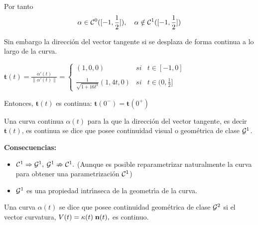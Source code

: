 \documentclass[twoside]{report}
\begin{document}
\vspace{0.3cm}

Por tanto $$\alpha\in {\cal C}^0([-1,\frac{1}{2}]), \quad \alpha\notin {\cal C}^1([-1,\frac{1}{2}])$$

Sin embargo la direcci\'{o}n del vector tangente si se desplaza de forma continua a lo largo de la curva.

$\mathbf{t}(t)=\frac{\alpha'(t)}{\parallel\alpha'(t)\parallel}=\left\{\begin{array}{ccc}
(1,0,0) & si & t\in [-1,0]\\
 & & \\
\displaystyle \frac{1}{\sqrt{1+16t^2}}(1,4t,0) & si & t\in (0,
\frac{1}{2}]
\end{array}\right.$

\vspace{0.3cm}


Entonces, $\mathbf{t}(t)$ es continua: $\mathbf{t}(0^{-})= \mathbf{t}(0^{+})$

\vspace{0.3cm}

\begin{df} Una curva continua $\alpha(t)$ para la que la direcci\'{o}n del vector tangente, es decir $\mathbf{t}(t)$, es continua se dice que posee continuidad visual o geom\'{e}trica de clase ${\cal G}^1$.
\end{df}

\vspace{0.3cm}

{\bf Consecuencias:}
\begin{itemize}
\item ${\cal C}^1 \Rightarrow {\cal G}^1,$ \hspace{0.5cm} $ {\cal G}^1 \nRightarrow {\cal C}^1.$ (Aunque es posible reparametrizar naturalmente la curva para obtener una parametrizaci\'{o}n $ {\cal C}^1$)
\item ${\cal G}^1$ es una propiedad intr\'{\i}nseca  de la geometr\'{\i}a de la curva.
\end{itemize}

\vspace{0.3cm}

\begin{df} Una curva $\alpha(t)$ se dice que posee continuidad geom\'{e}trica de clase ${\cal G}^2$ si el vector curvatura, $V(t)=\kappa(t) \; {\bf n}(t),$ es continuo.
\end{df}

\vspace{0.5cm}
\end{document}

